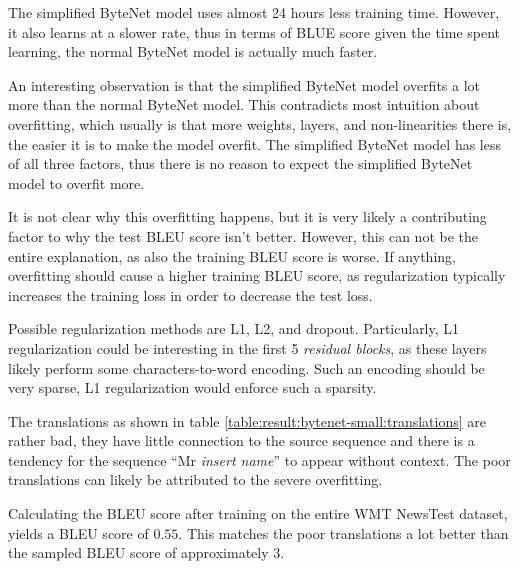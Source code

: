 The simplified ByteNet model uses almost 24 hours less training time. However, it also learns at a slower rate, thus in terms of BLUE score given the time spent learning, the normal ByteNet model is actually much faster.

An interesting observation is that the simplified ByteNet model overfits a lot more than the normal ByteNet model. This contradicts most intuition about overfitting, which usually is that more weights, layers, and non-linearities there is, the easier it is to make the model overfit. The simplified ByteNet model has less of all three factors, thus there is no reason to expect the simplified ByteNet model to overfit more.

It is not clear why this overfitting happens, but it is very likely a contributing factor to why the test BLEU score isn't better. However, this can not be the entire explanation, as also the training BLEU score is worse. If anything, overfitting should cause a higher training BLEU score, as regularization typically increases the training loss in order to decrease the test loss.

Possible regularization methods are L1, L2, and dropout. Particularly, L1 regularization could be interesting in the first 5 \textit{residual blocks}, as these layers likely perform some characters-to-word encoding. Such an encoding should be very sparse, L1 regularization would enforce such a sparsity.

The translations as shown in table \ref{table:result:bytenet-small:translations} are rather bad, they have little connection to the source sequence and there is a tendency for the sequence ``Mr \textit{insert name}'' to appear without context. The poor translations can likely be attributed to the severe overfitting.

Calculating the BLEU score after training on the entire WMT NewsTest dataset, yields a BLEU score of $0.55$. This matches the poor translations a lot better than the sampled BLEU score of approximately $3$.

